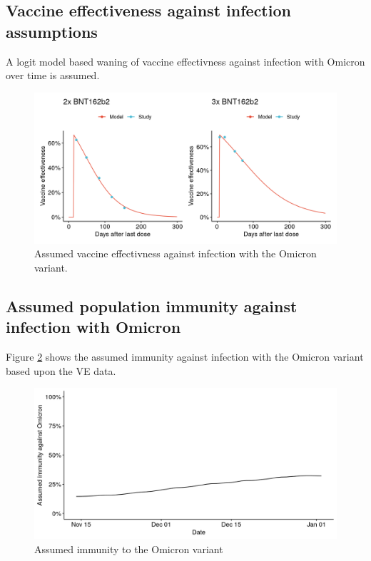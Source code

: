 \documentclass[
]{article}
\begin{document}
\hypertarget{vaccine-effectiveness-against-infection-assumptions}{%
\subsection{Vaccine effectiveness against infection assumptions}\label{vaccine-effectiveness-against-infection-assumptions}}

A logit model based waning of vaccine effectivness
against infection with Omicron over time is assumed.

\begin{figure}

{\centering \includegraphics[width=0.75\linewidth]{omicron_austria_files/figure-latex/assumed-ve-1} 

}

\caption{Assumed vaccine effectivness against infection with the Omicron variant.}\label{fig:assumed-ve}
\end{figure}

\hypertarget{assumed-population-immunity-against-infection-with-omicron}{%
\subsection{Assumed population immunity against infection with Omicron}\label{assumed-population-immunity-against-infection-with-omicron}}

Figure \ref{fig:pop-immunity-omicron} shows the assumed immunity against infection with the Omicron variant
based upon the VE data.

\begin{figure}

{\centering \includegraphics[width=0.75\linewidth]{omicron_austria_files/figure-latex/pop-immunity-omicron-1} 

}

\caption{Assumed immunity to the Omicron variant}\label{fig:pop-immunity-omicron}
\end{figure}
\end{document}
